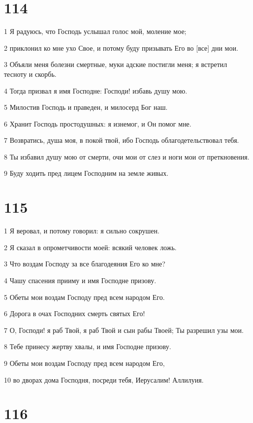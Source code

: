 \chapter{114}

\par 1 Я радуюсь, что Господь услышал голос мой, моление мое;
\par 2 приклонил ко мне ухо Свое, и потому буду призывать Его во [все] дни мои.
\par 3 Объяли меня болезни смертные, муки адские постигли меня; я встретил тесноту и скорбь.
\par 4 Тогда призвал я имя Господне: Господи! избавь душу мою.
\par 5 Милостив Господь и праведен, и милосерд Бог наш.
\par 6 Хранит Господь простодушных: я изнемог, и Он помог мне.
\par 7 Возвратись, душа моя, в покой твой, ибо Господь облагодетельствовал тебя.
\par 8 Ты избавил душу мою от смерти, очи мои от слез и ноги мои от преткновения.
\par 9 Буду ходить пред лицем Господним на земле живых.

\chapter{115}

\par 1 Я веровал, и потому говорил: я сильно сокрушен.
\par 2 Я сказал в опрометчивости моей: всякий человек ложь.
\par 3 Что воздам Господу за все благодеяния Его ко мне?
\par 4 Чашу спасения прииму и имя Господне призову.
\par 5 Обеты мои воздам Господу пред всем народом Его.
\par 6 Дорога в очах Господних смерть святых Его!
\par 7 О, Господи! я раб Твой, я раб Твой и сын рабы Твоей; Ты разрешил узы мои.
\par 8 Тебе принесу жертву хвалы, и имя Господне призову.
\par 9 Обеты мои воздам Господу пред всем народом Его,
\par 10 во дворах дома Господня, посреди тебя, Иерусалим! Аллилуия.

\chapter{116}

